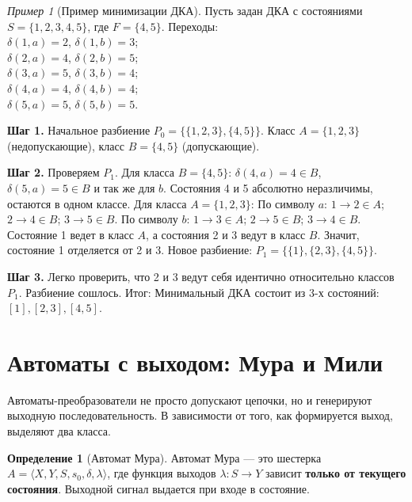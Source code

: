 \documentclass[12pt,a4paper]{article}
\theoremstyle{definition}
\newtheorem{definition}{Определение}
\theoremstyle{plain}
\theoremstyle{remark}
\newtheorem{example}{Пример}
\begin{document}
\begin{example}[Пример минимизации ДКА]
Пусть задан ДКА с состояниями $S=\{1,2,3,4,5\}$, где $F=\{4,5\}$.
Переходы:\\
$\delta(1,a)=2$, $\delta(1,b)=3$;\\
$\delta(2,a)=4$, $\delta(2,b)=5$;\\
$\delta(3,a)=5$, $\delta(3,b)=4$;\\
$\delta(4,a)=4$, $\delta(4,b)=4$;\\
$\delta(5,a)=5$, $\delta(5,b)=5$.

\textbf{Шаг 1.} Начальное разбиение $P_0 = \{ \{1,2,3\}, \{4,5\} \}$. Класс $A=\{1,2,3\}$ (недопускающие), класс $B=\{4,5\}$ (допускающие).

\textbf{Шаг 2.} Проверяем $P_1$.
Для класса $B=\{4,5\}$: $\delta(4,a)=4 \in B$, $\delta(5,a)=5 \in B$ и так же для $b$. Состояния 4 и 5 абсолютно неразличимы, остаются в одном классе.
Для класса $A=\{1,2,3\}$:
По символу $a$: $1 \to 2 \in A$; $2 \to 4 \in B$; $3 \to 5 \in B$.
По символу $b$: $1 \to 3 \in A$; $2 \to 5 \in B$; $3 \to 4 \in B$.
Состояние 1 ведет в класс $A$, а состояния 2 и 3 ведут в класс $B$. Значит, состояние 1 отделяется от 2 и 3.
Новое разбиение: $P_1 = \{ \{1\}, \{2,3\}, \{4,5\} \}$.

\textbf{Шаг 3.} Легко проверить, что 2 и 3 ведут себя идентично относительно классов $P_1$. Разбиение сошлось.
Итог: Минимальный ДКА состоит из 3-х состояний: $[1], [2,3],[4,5]$.
\end{example}

\section{Автоматы с выходом: Мура и Мили}

Автоматы-преобразователи не просто допускают цепочки, но и генерируют выходную последовательность. В зависимости от того, как формируется выход, выделяют два класса.

\begin{definition}[Автомат Мура]
Автомат Мура — это шестерка $A = \langle X, Y, S, s_0, \delta, \lambda \rangle$, где функция выходов $\lambda: S \to Y$ зависит \textbf{только от текущего состояния}.
Выходной сигнал выдается при входе в состояние.
\end{definition}
\end{document}
